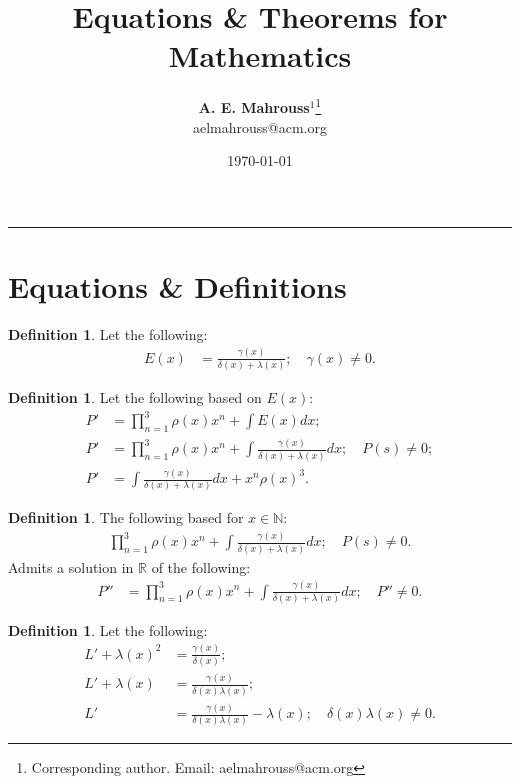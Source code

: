 \documentclass[10pt]{article}
\title{%
  \vspace{-1.5em}%
  \large\textbf{Equations \& Theorems for Mathematics}%
}
\author{%
  \textbf{A. E. Mahrouss}$^{1}$\thanks{Corresponding author. Email: aelmahrouss@acm.org}
  \\aelmahrouss@acm.org\\[0.4em]
}
\date{%
  \small \today
}
\theoremstyle{plain}
\theoremstyle{definition}
\newtheorem{definition}[theorem]{Definition}
\theoremstyle{remark}
\begin{document}

  \maketitle
  \vspace{-0.5em}
  \vspace{0.8em}
  \rule{\linewidth}{0.4pt}
  \vspace{1em}


\section{Equations \& Definitions}

\begin{definition}
	Let the following:
	\begin{align*}
		E(x) &= \frac{\gamma(x)}{\delta(x) + \lambda(x)}; \quad \gamma(x) \neq 0.
	\end{align*}
\end{definition}

\begin{definition}
	Let the following based on $E(x)$:
	\begin{align*}
		P' &= \prod_{n=1}^{3}\rho(x) x^{n} + \int E(x) dx;\\
		P' &= \prod_{n=1}^{3}\rho(x) x^{n} + \int \frac{\gamma(x)}{\delta(x) + \lambda(x)} dx; \quad P(s) \neq 0;\\
		P' &= \int \frac{\gamma(x)}{\delta(x) + \lambda(x)} dx + x^{n} \rho(x)^{3}.
	\end{align*}
\end{definition}

\begin{definition}
	The following based for $x \in \mathbb{N}$:
	\begin{align*}
		\prod_{n=1}^{3}\rho(x) x^{n} + \int \frac{\gamma(x)}{\delta(x) + \lambda(x)} dx; \quad P(s) \neq 0.
	\end{align*}
	Admits a solution in $\mathbb{R}$ of the following:
	\begin{align*}
		P'' &= \prod_{n=1}^{3}\rho(x) x^{n} + \int \frac{\gamma(x)}{\delta(x) + \lambda(x)} dx; \quad P'' \neq 0.
	\end{align*}
\end{definition}

\begin{definition}
	Let the following:
	\begin{align*}
		L' + \lambda(x)^{2} &= \frac{\gamma(x)}{\delta(x)};\\
	 	L' + \lambda(x) &= \frac{\gamma(x)}{\delta(x)  \lambda(x) };\\
	 	L' &= \frac{\gamma(x)}{\delta(x)  \lambda(x) } - \lambda(x); \quad \delta(x)\lambda(x) \neq 0.
	\end{align*}
\end{definition}
\end{document}
